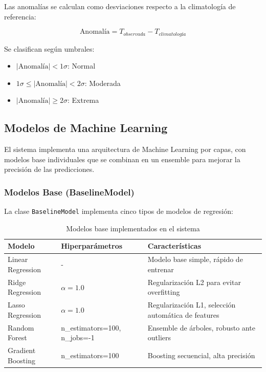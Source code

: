 \documentclass[12pt,a4paper]{scrartcl}
\begin{document}
Las anomalías se calculan como desviaciones respecto a la climatología de referencia:

\begin{equation}
    \text{Anomalía} = T_{observada} - T_{climatología}
\end{equation}

Se clasifican según umbrales:
\begin{itemize}
    \item $|\text{Anomalía}| < 1\sigma$: Normal
    \item $1\sigma \leq |\text{Anomalía}| < 2\sigma$: Moderada
    \item $|\text{Anomalía}| \geq 2\sigma$: Extrema
\end{itemize}

\subsection{Modelos de Machine Learning}

El sistema implementa una arquitectura de Machine Learning por capas, con modelos base individuales que se combinan en un ensemble para mejorar la precisión de las predicciones.

\subsubsection{Modelos Base (BaselineModel)}

La clase \texttt{BaselineModel} implementa cinco tipos de modelos de regresión:

\begin{table}[h]
\centering
\begin{tabular}{@{}llp{6cm}@{}}
\toprule
\textbf{Modelo} & \textbf{Hiperparámetros} & \textbf{Características} \\
\midrule
Linear Regression & - & Modelo base simple, rápido de entrenar \\
Ridge Regression & $\alpha = 1.0$ & Regularización L2 para evitar overfitting \\
Lasso Regression & $\alpha = 1.0$ & Regularización L1, selección automática de features \\
Random Forest & n\_estimators=100, n\_jobs=-1 & Ensemble de árboles, robusto ante outliers \\
Gradient Boosting & n\_estimators=100 & Boosting secuencial, alta precisión \\
\bottomrule
\end{tabular}
\caption{Modelos base implementados en el sistema}
\end{table}
\end{document}
